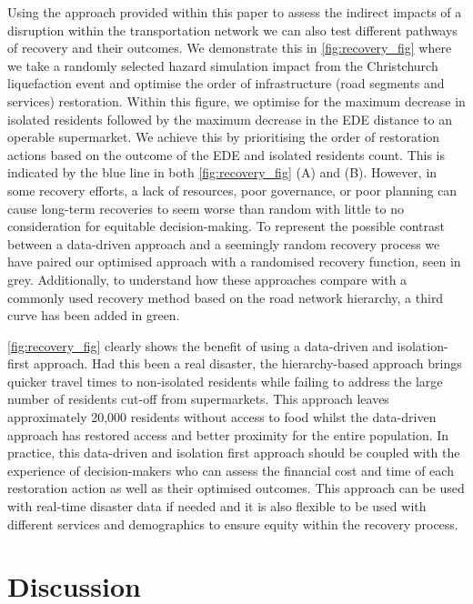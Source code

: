 \documentclass[review,3p,times,onecolumn,sort&compress,12pt]{elsarticle}
\begin{document}
Using the approach provided within this paper to assess the indirect impacts of a disruption within the transportation network we can also test different pathways of recovery and their outcomes.
We demonstrate this in \autoref{fig:recovery_fig} where we take a randomly selected hazard simulation impact from the Christchurch liquefaction event and optimise the order of infrastructure (road segments and services) restoration.
Within this figure, we optimise for the maximum decrease in isolated residents followed by the maximum decrease in the EDE distance to an operable supermarket.
We achieve this by prioritising the order of restoration actions based on the outcome of the EDE and isolated residents count.
This is indicated by the blue line in both \autoref{fig:recovery_fig} (A) and (B).
However, in some recovery efforts, a lack of resources, poor governance, or poor planning can cause long-term recoveries to seem worse than random with little to no consideration for equitable decision-making.
To represent the possible contrast between a data-driven approach and a seemingly random recovery process we have paired our optimised approach with a randomised recovery function, seen in grey.
Additionally, to understand how these approaches compare with a commonly used recovery method based on the road network hierarchy, a third curve has been added in green.

\autoref{fig:recovery_fig} clearly shows the benefit of using a data-driven and isolation-first approach.
Had this been a real disaster, the hierarchy-based approach brings quicker travel times to non-isolated residents while failing to address the large number of residents cut-off from supermarkets.
This approach leaves approximately 20,000 residents without access to food whilst the data-driven approach has restored access and better proximity for the entire population.
In practice, this data-driven and isolation first approach should be coupled with the experience of decision-makers who can assess the financial cost and time of each restoration action as well as their optimised outcomes.
This approach can be used with real-time disaster data if needed and it is also flexible to be used with different services and demographics to ensure equity within the recovery process.


\section{Discussion}
\end{document}
